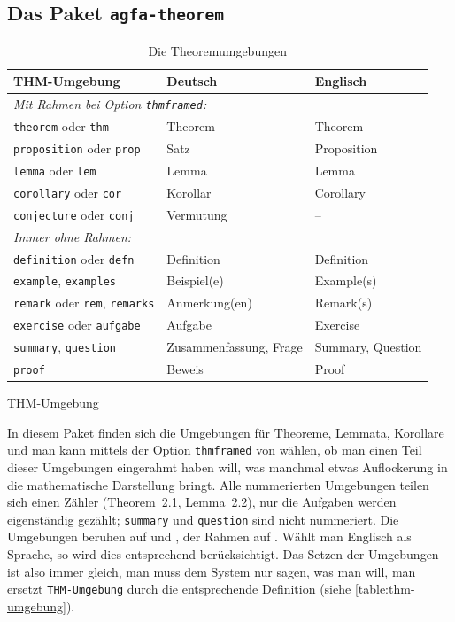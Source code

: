 \subsection{Das Paket \texttt{agfa-theorem}}\label{subsec:agfa-theorem}
\begin{table}
\centering
\caption{Die Theoremumgebungen}\label{table:thm-umgebung}
\begin{tabular}{lll}\toprule
THM-Umgebung	& Deutsch & Englisch \\ \midrule
\multicolumn{3}{l}{\emph{Mit Rahmen bei Option \texttt{thmframed}:}}\\ 
\texttt{theorem} oder \texttt{thm} 	& Theorem & Theorem \\
\texttt{proposition} oder \texttt{prop}	& Satz & Proposition \\ 
\texttt{lemma} oder \texttt{lem}	& Lemma & Lemma \\ 
\texttt{corollary} oder \texttt{cor}	& Korollar & Corollary \\ 
\texttt{conjecture} oder \texttt{conj}	& Vermutung & -- \\ \midrule
\multicolumn{3}{l}{\emph{Immer ohne Rahmen:}}\\ 
\texttt{definition} oder \texttt{defn} & Definition & Definition \\
\texttt{example}, \texttt{examples} & Beispiel(e) & Example(s) \\
\texttt{remark} oder \texttt{rem}, \texttt{remarks} & Anmerkung(en) & Remark(s) \\
\texttt{exercise} oder \texttt{aufgabe} & Aufgabe & Exercise \\
\texttt{summary}, \texttt{question} & Zusammenfassung, Frage & Summary, Question \\
\texttt{proof}	& Beweis & Proof \\
\bottomrule
\end{tabular}
\end{table}

%
\begin{docEnvironment}{THM-Umgebung}{}
\end{docEnvironment}
%

In diesem Paket finden sich die Umgebungen für Theoreme, Lemmata, Korollare \etc und man kann mittels der Option \texttt{thmframed} von  wählen, ob man einen Teil dieser Umgebungen eingerahmt haben will, was manchmal etwas Auflockerung in die mathematische Darstellung bringt.
Alle nummerierten Umgebungen teilen sich einen Zähler (\zB Theorem~2.1, Lemma~2.2), nur die Aufgaben werden eigenständig gezählt; \texttt{summary} und \texttt{question} sind nicht nummeriert.
Die Umgebungen beruhen auf  und , der Rahmen auf .
Wählt man Englisch als Sprache, so wird dies entsprechend berücksichtigt.
Das Setzen der Umgebungen ist also immer gleich, man muss dem System nur sagen, was man will, \dh man ersetzt \texttt{THM-Umgebung} durch die entsprechende Definition (siehe \vref{table:thm-umgebung}). 

